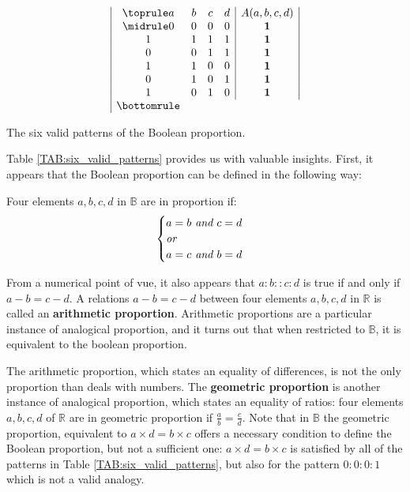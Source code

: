 \begin{table}[t]
  \centering
  $$
  \begin{array}{|cccc|c|}
    \toprule
    a & b & c & d &  A(a, b, c, d)\\
    \midrule
    0 & 0 & 0 & 0 &   \textbf{1}\\
    1 & 1 & 1 & 1 &   \textbf{1}\\
    0 & 0 & 1 & 1 &   \textbf{1}\\
    1 & 1 & 0 & 0 &   \textbf{1}\\
    0 & 1 & 0 & 1 &   \textbf{1}\\
    1 & 0 & 1 & 0 &   \textbf{1}\\
    \bottomrule
  \end{array}
  $$
  \caption{The six valid patterns of the Boolean proportion.}
  \label{TAB:six_valid_patterns}
\end{table}

Table \ref{TAB:six_valid_patterns} provides us with valuable insights.  First,
it appears that the Boolean proportion can be defined in the following way:

\begin{definition}
  \label{DEF:boolean_proportion_informal}
  Four elements $a, b, c, d$ in $\mathbb{B}$ are in proportion if:
  $$
  \begin{cases}
    a = b \emph{ and } c = d\\
    \emph{or}\\
    a = c \emph{ and } b = d\\
  \end{cases}
  $$
\end{definition}

From a numerical point of vue, it also appears that $a:b::c:d$ is true if and
only if $a - b = c - d$. A relations $a - b = c - d$ between four elements $a,
b, c, d$ in $\mathbb{R}$ is called an \textbf{arithmetic proportion}.
Arithmetic proportions are a particular instance of analogical proportion, and
it turns out that when restricted to $\mathbb{B}$, it is equivalent to the
boolean proportion.

The arithmetic proportion, which states an equality of differences, is not the
only proportion than deals with numbers. The \textbf{geometric proportion} is
another instance of analogical proportion, which states an equality of ratios:
four elements $a, b, c, d$ of $\mathbb{R}$ are in geometric proportion if
$\frac{a}{b} = \frac{c}{d}$.
Note that in $\mathbb{B}$ the geometric proportion, equivalent to $a\times d =
b\times c$ offers a necessary condition to define the Boolean proportion, but
not a sufficient one: $a \times d = b\times c$ is satisfied by all of the
patterns in Table \ref{TAB:six_valid_patterns}, but also for the pattern $0: 0:
0: 1$ which is not a valid analogy.

